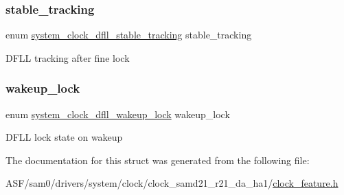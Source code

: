 \subsubsection{\texorpdfstring{stable\_tracking}{stable\_tracking}}
{\footnotesize\ttfamily enum \mbox{\hyperlink{group__asfdoc__sam0__system__clock__group_gaf9b0eb010541f1d7c8af3eeb0573043d}{system\+\_\+clock\+\_\+dfll\+\_\+stable\+\_\+tracking}} stable\+\_\+tracking}

D\+F\+LL tracking after fine lock \mbox{\label{structsystem__clock__source__dfll__config_a843f42c0b5b46661a11b921a5fdd43a6}} 
\subsubsection{\texorpdfstring{wakeup\_lock}{wakeup\_lock}}
{\footnotesize\ttfamily enum \mbox{\hyperlink{group__asfdoc__sam0__system__clock__group_ga6ce68deec62f12bb85ddb2f8c103ada5}{system\+\_\+clock\+\_\+dfll\+\_\+wakeup\+\_\+lock}} wakeup\+\_\+lock}

D\+F\+LL lock state on wakeup 

The documentation for this struct was generated from the following file\+:\begin{DoxyCompactItemize}
\item 
A\+S\+F/sam0/drivers/system/clock/clock\+\_\+samd21\+\_\+r21\+\_\+da\+\_\+ha1/\mbox{\hyperlink{clock__feature_8h}{clock\+\_\+feature.\+h}}\end{DoxyCompactItemize}
